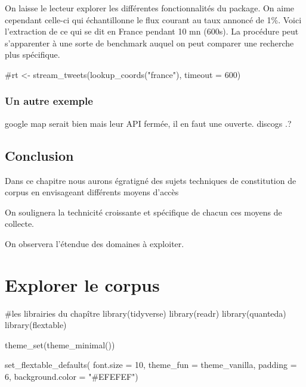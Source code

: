 \documentclass[
  letterpaper,
  DIV=11,
  numbers=noendperiod]{scrreprt}
\newenvironment{Shaded}{\begin{snugshade}}{\end{snugshade}}
\newcommand{\AttributeTok}[1]{\textcolor[rgb]{0.40,0.45,0.13}{#1}}
\newcommand{\CommentTok}[1]{\textcolor[rgb]{0.37,0.37,0.37}{#1}}
\newcommand{\DecValTok}[1]{\textcolor[rgb]{0.68,0.00,0.00}{#1}}
\newcommand{\FunctionTok}[1]{\textcolor[rgb]{0.28,0.35,0.67}{#1}}
\newcommand{\NormalTok}[1]{\textcolor[rgb]{0.00,0.23,0.31}{#1}}
\newcommand{\StringTok}[1]{\textcolor[rgb]{0.13,0.47,0.30}{#1}}
\begin{document}
On laisse le lecteur explorer les différentes fonctionnalités du
package. On aime cependant celle-ci qui échantillonne le flux courant au
taux annoncé de 1\%. Voici l'extraction de ce qui se dit en France
pendant 10 mn (600s). La procédure peut s'apparenter à une sorte de
benchmark auquel on peut comparer une recherche plus spécifique.

\begin{Shaded}
\begin{Highlighting}[]
\CommentTok{\#rt \textless{}{-} stream\_tweets(lookup\_coords("france"), timeout = 600)}
\end{Highlighting}
\end{Shaded}

\subsection{Un autre exemple}\label{un-autre-exemple}

google map serait bien mais leur API fermée, il en faut une ouverte.
discogs .?

\section{Conclusion}\label{conclusion-2}

Dans ce chapitre nous aurons égratigné des sujets techniques de
constitution de corpus en envisageant différents moyens d'accès

On soulignera la technicité croissante et spécifique de chacun ces
moyens de collecte.

On observera l'étendue des domaines à exploiter.


\chapter{Explorer le corpus}\label{explorer-le-corpus}

\begin{Shaded}
\begin{Highlighting}[]
\CommentTok{\#les librairies du chapître}
\FunctionTok{library}\NormalTok{(tidyverse)}
\FunctionTok{library}\NormalTok{(readr)}
\FunctionTok{library}\NormalTok{(quanteda)}
\FunctionTok{library}\NormalTok{(flextable)}


\FunctionTok{theme\_set}\NormalTok{(}\FunctionTok{theme\_minimal}\NormalTok{()) }

\FunctionTok{set\_flextable\_defaults}\NormalTok{(}
  \AttributeTok{font.size =} \DecValTok{10}\NormalTok{, }\AttributeTok{theme\_fun =}\NormalTok{ theme\_vanilla,}
  \AttributeTok{padding =} \DecValTok{6}\NormalTok{,}
  \AttributeTok{background.color =} \StringTok{"\#EFEFEF"}\NormalTok{)}
\end{Highlighting}
\end{Shaded}
\end{document}
